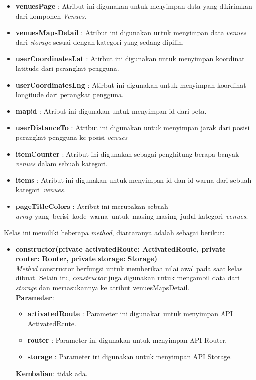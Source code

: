 \begin{enumerate}
				\begin{itemize}
					\item \textbf{venuesPage} : Atribut ini digunakan untuk menyimpan data yang dikirimkan dari komponen \textit{Venues}.
					\item \textbf{venuesMapsDetail} : Atribut ini digunakan untuk menyimpan data \textit{venues} dari \textit{storage} sesuai dengan kategori yang sedang dipilih.
					\item \textbf{userCoordinatesLat} : Atirbut ini digunakan untuk menyimpan koordinat latitude dari perangkat pengguna.
					\item \textbf{userCoordinatesLng} : Atirbut ini digunakan untuk menyimpan koordinat longitude dari perangkat pengguna.
					\item \textbf{mapid} : Atribut ini digunakan untuk menyimpan id dari peta.
					\item \textbf{userDistanceTo} : Atribut ini digunakan untuk menyimpan jarak dari posisi perangkat pengguna ke posisi \textit{venues}.
					\item \textbf{itemCounter} : Atribut ini digunakan sebagai penghitung berapa banyak \textit{venues} dalam sebuah kategori.
					\item \textbf{items} : Atribut ini digunakan untuk menyimpan id dan id warna dari sebuah kategori~\textit{venues}.
					\item \textbf{pageTitleColors} : Atribut ini merupakan sebuah \textit{array}~yang~berisi~kode~warna~untuk~masing-masing~judul kategori~\textit{venues}.
				\end{itemize} 
				Kelas ini memiliki beberapa \textit{method}, diantaranya adalah sebagai berikut:
				\begin{itemize}
					\item \textbf{constructor(private activatedRoute: ActivatedRoute, private router: Router, private storage: Storage)} \\
						\textit{Method} constructor berfungsi untuk memberikan nilai awal pada saat kelas dibuat. Selain itu, \textit{constructor} juga digunakan untuk mengambil data dari \textit{storage} dan memasukannya ke atribut venuesMapsDetail.\\
						\textbf{Parameter}:
						\begin{itemize}
							\item \textbf{activatedRoute} : Parameter ini digunakan untuk menyimpan API ActivatedRoute.
							\item \textbf{router} : Parameter ini digunakan untuk menyimpan API Router.
							\item \textbf{storage} : Parameter ini digunakan untuk menyimpan API Storage.
						\end{itemize}
						\textbf{Kembalian}: tidak ada.
						

\end{itemize}
\end{enumerate}
